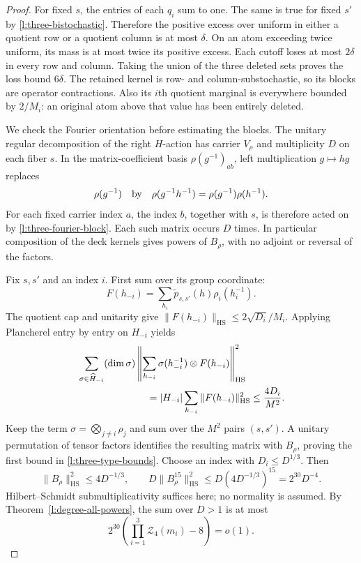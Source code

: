 \begin{proof}
For fixed $s$, the entries of each $q_i$ sum to one.  The same is
true for fixed $s'$ by \eqref{l:three-bistochastic}.  Therefore the
positive excess over uniform in either a quotient row or a quotient
column is at most $\delta$.  On an atom exceeding twice uniform,
its mass is at most twice its positive excess.  Each cutoff loses
at most $2\delta$ in every row and column.  Taking the union of the
three deleted sets proves the loss bound $6\delta$.
The retained kernel is row- and column-substochastic, so its blocks
are operator contractions.  Also its $i$th quotient marginal is
everywhere bounded by $2/M_i$: an original atom above that value
has been entirely deleted.

We check the Fourier orientation before estimating the blocks.  The
unitary regular decomposition of the right $H$-action has carrier
$V_\rho$ and multiplicity $D$ on each fiber $s$.  In the
matrix-coefficient basis $\rho(g^{-1})_{ab}$, left multiplication
$g\mapsto hg$ replaces
\[
 \rho(g^{-1})\quad\hbox{by}\quad
 \rho(g^{-1}h^{-1})=\rho(g^{-1})\rho(h^{-1}).
\]
For each fixed carrier index $a$, the index $b$, together with $s$,
is therefore acted on by \eqref{l:three-fourier-block}.  Each such
matrix occurs $D$ times.  In particular composition of the deck
kernels gives powers of $B_\rho$, with no adjoint or reversal of
the factors.

Fix $s,s'$ and an index $i$.  First sum over its group coordinate:
\[
 F(h_{-i})=\sum_{h_i}\widetilde p_{s,s'}(h)\rho_i(h_i^{-1}).
\]
The quotient cap and unitarity give
$\|F(h_{-i})\|_{\mathrm{HS}}\le2\sqrt{D_i}/M_i$.
Applying Plancherel entry by entry on $H_{-i}$ yields
\begin{align*}
 &\sum_{\sigma\in\widehat H_{-i}}(\dim\sigma)
 \left\|\sum_{h_{-i}}\sigma(h_{-i}^{-1})\otimes
                       F(h_{-i})\right\|_{\mathrm{HS}}^2\\
 &\hspace{25mm}=|H_{-i}|\sum_{h_{-i}}\|F(h_{-i})\|_{\mathrm{HS}}^2
 \le\frac{4D_i}{M^2}.
\end{align*}
Keep the term $\sigma=\bigotimes_{j\ne i}\rho_j$ and sum over the
$M^2$ pairs $(s,s')$.  A unitary permutation of tensor factors
identifies the resulting matrix with $B_\rho$, proving the first
bound in \eqref{l:three-type-bounds}.  Choose an index with
$D_i\le D^{1/3}$.  Then
\[
 \|B_\rho\|_{\mathrm{HS}}^2\le4D^{-1/3},\qquad
 D\|B_\rho^{15}\|_{\mathrm{HS}}^2
 \le D(4D^{-1/3})^{15}=2^{30}D^{-4}.
\]
Hilbert--Schmidt submultiplicativity suffices here; no normality is
assumed.  By Theorem~\ref{l:degree-all-powers}, the sum over $D>1$
is at most
\[
 2^{30}\left(\prod_{i=1}^3 \mathcal Z_4(m_i)-8\right)=o(1).
\]


\end{proof}
